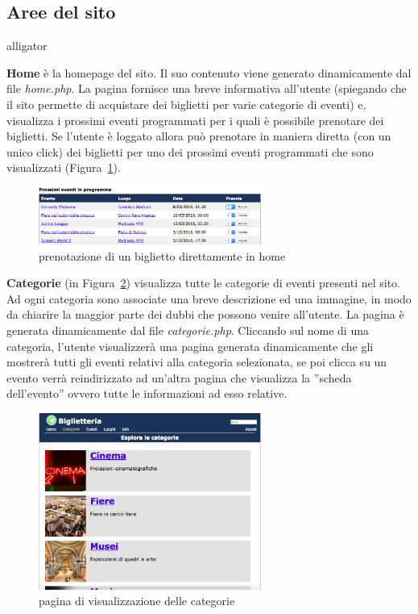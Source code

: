 \documentclass[10pt, a4paper]{article}
\begin{document}
\subsection{Aree del sito}
\begin{labeling}{alligator}
\item[\textbf{\textcolor{UniPD}{Home}}] è la homepage del sito. Il suo contenuto viene
generato dinamicamente dal file \emph{home.php}.
La pagina fornisce una breve informativa all'utente (spiegando che il sito permette di
acquistare dei biglietti per varie categorie di eventi) e, visualizza
i prossimi eventi programmati per i quali è possibile prenotare dei biglietti.
Se l'utente è loggato allora può prenotare in maniera diretta (con un unico click) dei
biglietti per uno dei prossimi eventi programmati che sono visualizzati
(Figura~\ref{fig:home_prenota}).

\begin{figure}[h!]
  \centering
  \includegraphics[width=0.65\textwidth]{Images/home_prenota.png}
  \caption{prenotazione di un biglietto direttamente in home}
  \label{fig:home_prenota}
\end{figure}

\item[\textbf{\textcolor{UniPD}{Categorie}}] (in Figura~\ref{fig:categorie}) 
visualizza tutte le categorie di eventi presenti nel sito.
Ad ogni categoria sono associate una breve descrizione ed una immagine,
in modo da chiarire la maggior parte dei dubbi che possono venire all'utente.
La pagina è generata dinamicamente dal file \emph{categorie.php}.
Cliccando sul nome di una categoria, l'utente visualizzerà una pagina 
generata dinamicamente che gli mostrerà tutti gli eventi relativi alla
categoria selezionata, se poi clicca su un evento verrà reindirizzato
ad un'altra pagina che visualizza la ''scheda dell'evento'' ovvero tutte
le informazioni ad esso relative.

\begin{figure}[h!]
  \centering
  \includegraphics[width=0.65\textwidth]{Images/categorie.png}
  \caption{pagina di visualizzazione delle categorie}
  \label{fig:categorie}
\end{figure}



\end{labeling}
\end{document}
